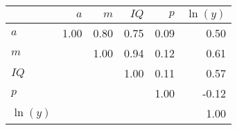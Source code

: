 \begin{tabular}{lrrrrr}
\hline
 & $a$  & $m$  & $IQ$  & $p$  & $\ln(y)$  \\ 
\hline
$a$ & 1.00  & 0.80  & 0.75  & 0.09  & 0.50  \\ 
$m$ &   & 1.00  & 0.94  & 0.12  & 0.61  \\ 
$IQ$ &   &   & 1.00  & 0.11  & 0.57  \\ 
$p$ &   &   &   & 1.00  & -0.12  \\ 
$\ln(y)$ &   &   &   &   & 1.00  \\ 
\hline
\end{tabular}%
